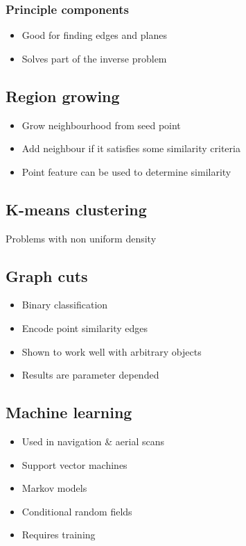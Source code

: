 		\subsubsection{Principle components}
			\begin{itemize}					
			\item Good for finding edges and planes
			\item Solves part of the inverse problem
			\end{itemize}
			

	\subsection{Region growing}
		\begin{itemize}
		\item Grow neighbourhood from seed point
		\item Add neighbour if it satisfies some similarity criteria
		\item Point feature can be used to determine similarity
		\end{itemize}

	\subsection{K-means clustering}
		Problems with non uniform density

	\subsection{Graph cuts}
		\begin{itemize}
		\item Binary classification
		\item Encode point similarity edges
		\item Shown to work well with arbitrary objects
		\item Results are parameter depended
		\end{itemize}

	\subsection{Machine learning}
		\begin{itemize}
		\item Used in navigation \& aerial scans
		\item Support vector machines
		\item Markov models
		\item Conditional random fields
		\item Requires training
		\end{itemize}
		
